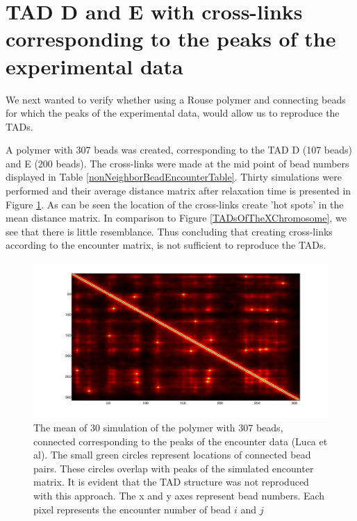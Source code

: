 \documentclass[12pt]{book}
\begin{document}
\section{TAD D and E with cross-links corresponding to the peaks of the experimental data}
We next wanted to verify whether using a Rouse polymer and connecting beads for which the peaks of the experimental data, would allow us to reproduce the TADs. 

A polymer with 307 beads was created, corresponding to the TAD D (107 beads) and E (200 beads). The cross-links were made at the mid point of bead numbers displayed in Table \ref{nonNeighborBeadEncounterTable}. Thirty simulations were performed and their average distance matrix after relaxation time is presented in Figure \ref{figure_meanEncounterMatrixOfSimulatingTADEandDWithLoops}. As can be seen the location of the cross-links create 'hot spots' in the mean distance matrix. In comparison to Figure \ref{TADsOfTheXChromosome}, we see that there is little resemblance. Thus concluding that creating cross-links according to the encounter matrix, is not sufficient to reproduce the TADs.

\begin{figure}[H]
\includegraphics[scale=0.2]{meanEncounterMatrixOfSimulatingTADEandDWithLoops}
\caption{\scriptsize{The mean of 30 simulation of the polymer with 307 beads, connected corresponding to the peaks of the encounter data (Luca et al). The small green circles represent locations of connected bead pairs. These circles overlap with peaks of the simulated encounter matrix. It is evident that the TAD structure was not reproduced with this approach. The x and y axes  represent bead numbers. Each pixel represents the encounter number of bead $i$ and $j$}}
\label{figure_meanEncounterMatrixOfSimulatingTADEandDWithLoops}
\end{figure}
\end{document}
